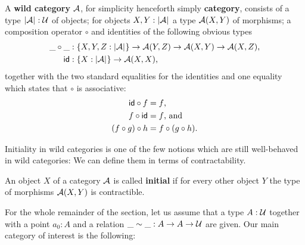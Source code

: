\begin{defn}
A \textbf{wild category} $\mathcal A$, for simplicity henceforth simply
\textbf{category}, consists of a type $\mathopen{}\left|\mathcal A\right|_{}^{}\mathclose{} : \mathcal{U}$ of objects; for
objects $X, Y : \mathopen{}\left|\mathcal A\right|_{}^{}\mathclose{}$ a type $\mathcal A(X, Y)$ of morphisms;
a composition operator $\circ$ and identities of the following obvious types
\begin{align*}
\_\circ\_ &: \{X, Y, Z : \mathopen{}\left|\mathcal A\right|_{}^{}\mathclose{}\} \to \mathcal A(Y, Z) \to \mathcal A(X, Y) \to \mathcal A(X, Z) \text{,} \\
\mathsf{id} &: \{X : \mathopen{}\left|\mathcal A\right|_{}^{}\mathclose{}\} \to \mathcal A(X, X) \text{,}
\end{align*}
together with the two standard equalities for the identities and
one equality which states that $\circ$ is associative:
\begin{align*}
\mathsf{id} \circ f &= f \text{,}\\
f \circ \mathsf{id} &= f \text{, and}\\
(f \circ g) \circ h &= f \circ (g \circ h) \text{.}
\end{align*}
\end{defn}

Initiality in wild categories is one of the few notions which are still well-behaved
in wild categories:
We can define them in terms of contractability.
\begin{defn}[Initiality]
An object $X$ of a category $\mathcal A$ is called \textbf{initial} if for every other
object $Y$ the type of morphisms $\mathcal A(X, Y)$ is contractible.
\end{defn}

For the whole remainder of the section, let us assume that a type $A : \mathcal{U}$
together with a point $a_0 : A$ and a relation $\_\sim\_ : A \to A \to \mathcal{U}$ are
given.
Our main category of interest is the following:

